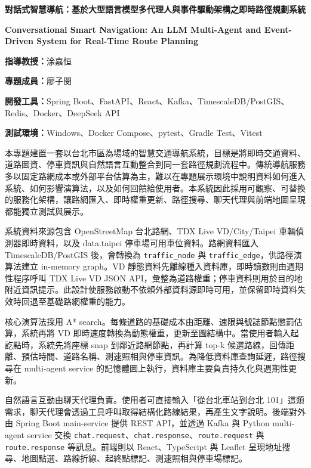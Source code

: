 \documentclass[12pt,a4paper]{article}
\newcommand{\infobox}[2]{\noindent\hspace{2em}\parbox[t]{0.86\textwidth}{\raggedright\textbf{#1：}#2}\par}
\newcommand{\sectiontitle}[1]{\vspace{0.8em}\noindent{\fontsize{16}{19}\selectfont\bfseries #1}\par\vspace{0.3em}}
\begin{document}
\begin{center}
{\fontsize{20}{24}\selectfont\bfseries 對話式智慧導航：基於大型語言模型多代理人與事件驅動架構之即時路徑規劃系統\par}
\vspace{0.4em}
{\fontsize{18}{22}\selectfont\bfseries Conversational Smart Navigation: An LLM Multi-Agent and Event-Driven System for Real-Time Route Planning\par}
\end{center}

\vspace{0.8em}
\infobox{指導教授}{涂嘉恒}
\infobox{專題成員}{廖子閔}
\infobox{開發工具}{Spring Boot、FastAPI、React、Kafka、TimescaleDB/PostGIS、Redis、Docker、DeepSeek API}
\infobox{測試環境}{Windows、Docker Compose、pytest、Gradle Test、Vitest}

\sectiontitle{一、專題簡介：}

本專題建置一套以台北市區為場域的智慧交通導航系統，目標是將即時交通資料、道路圖資、停車資訊與自然語言互動整合到同一套路徑規劃流程中。傳統導航服務多以固定路網成本或外部平台估算為主，難以在專題展示環境中說明資料如何進入系統、如何影響演算法，以及如何回饋給使用者。本系統因此採用可觀察、可替換的服務化架構，讓路網匯入、即時權重更新、路徑搜尋、聊天代理與前端地圖呈現都能獨立測試與展示。

系統資料來源包含 OpenStreetMap 台北路網、TDX Live VD/City/Taipei 車輛偵測器即時資料，以及 data.taipei 停車場可用車位資料。路網資料匯入 TimescaleDB/PostGIS 後，會轉換為 \texttt{traffic\_node} 與 \texttt{traffic\_edge}，供路徑演算法建立 in-memory graph。VD 靜態資料先離線種入資料庫，即時讀數則由週期性程序呼叫 TDX Live VD JSON API，彙整為道路權重；停車資料則用於目的地附近資訊提示。此設計使服務啟動不依賴外部資料源即時可用，並保留即時資料失效時回退至基礎路網權重的能力。

核心演算法採用 A* search。每條道路的基礎成本由距離、速限與號誌節點懲罰估算，系統再將 VD 即時速度轉換為動態權重，更新至圖結構中。當使用者輸入起訖點時，系統先將座標 snap 到鄰近路網節點，再計算 top-k 候選路線，回傳距離、預估時間、道路名稱、測速照相與停車資訊。為降低資料庫查詢延遲，路徑搜尋在 multi-agent service 的記憶體圖上執行，資料庫主要負責持久化與週期性更新。

自然語言互動由聊天代理負責。使用者可直接輸入「從台北車站到台北 101」這類需求，聊天代理會透過工具呼叫取得結構化路線結果，再產生文字說明。後端對外由 Spring Boot main-service 提供 REST API，並透過 Kafka 與 Python multi-agent service 交換 \texttt{chat.request}、\texttt{chat.response}、\texttt{route.request} 與 \texttt{route.response} 等訊息。前端則以 React、TypeScript 與 Leaflet 呈現地址搜尋、地圖點選、路線折線、起終點標記、測速照相與停車場標記。
\end{document}
